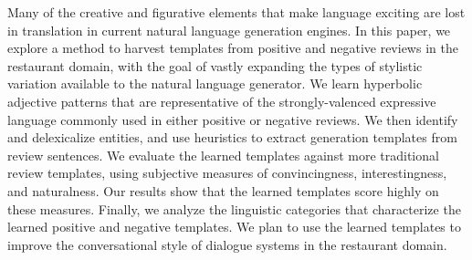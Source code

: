 Many of the creative and figurative elements that make language exciting are lost in translation in current natural language generation engines. In this paper, we explore a method to harvest templates from positive and negative reviews in the restaurant domain, with the goal of vastly expanding the types of stylistic variation available to the natural language generator. We learn hyperbolic adjective patterns that are representative of the strongly-valenced expressive language commonly used in either positive or negative reviews.  We then identify and delexicalize entities, and use heuristics to extract generation templates from review sentences. We evaluate the learned templates against more traditional review templates, using subjective measures of convincingness, interestingness, and naturalness. Our results show that the learned templates score highly on these measures.  Finally, we analyze the linguistic categories that characterize the learned positive and negative templates. We plan to use the learned templates to improve the conversational style of dialogue systems in the restaurant domain.
